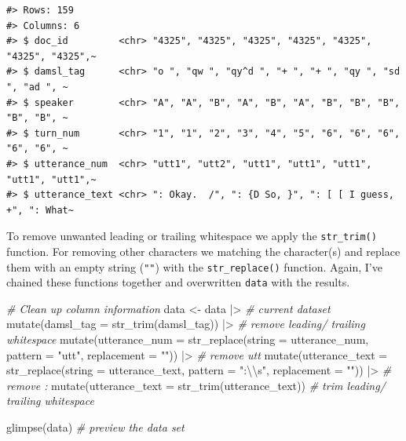 \documentclass[
  letterpaper,
]{scrbook}
\newenvironment{Shaded}{\begin{snugshade}}{\end{snugshade}}
\newcommand{\AttributeTok}[1]{\textcolor[rgb]{0.00,0.00,0.00}{#1}}
\newcommand{\CommentTok}[1]{\textcolor[rgb]{0.00,0.00,0.00}{\textit{#1}}}
\newcommand{\FunctionTok}[1]{\textcolor[rgb]{0.00,0.00,0.00}{#1}}
\newcommand{\NormalTok}[1]{\textcolor[rgb]{0.00,0.00,0.00}{#1}}
\newcommand{\OtherTok}[1]{\textcolor[rgb]{0.00,0.00,0.00}{#1}}
\newcommand{\SpecialCharTok}[1]{\textcolor[rgb]{0.00,0.00,0.00}{#1}}
\newcommand{\StringTok}[1]{\textcolor[rgb]{0.00,0.00,0.00}{#1}}
\begin{document}
\begin{verbatim}
#> Rows: 159
#> Columns: 6
#> $ doc_id         <chr> "4325", "4325", "4325", "4325", "4325", "4325", "4325",~
#> $ damsl_tag      <chr> "o ", "qw ", "qy^d ", "+ ", "+ ", "qy ", "sd ", "ad ", ~
#> $ speaker        <chr> "A", "A", "B", "A", "B", "A", "B", "B", "B", "B", "B", ~
#> $ turn_num       <chr> "1", "1", "2", "3", "4", "5", "6", "6", "6", "6", "6", ~
#> $ utterance_num  <chr> "utt1", "utt2", "utt1", "utt1", "utt1", "utt1", "utt1",~
#> $ utterance_text <chr> ": Okay.  /", ": {D So, }", ": [ [ I guess, +", ": What~
\end{verbatim}

To remove unwanted leading or trailing whitespace we apply the
\texttt{str\_trim()} function. For removing other characters we matching
the character(s) and replace them with an empty string (\texttt{""})
with the \texttt{str\_replace()} function. Again, I've chained these
functions together and overwritten \texttt{data} with the results.

\begin{Shaded}
\begin{Highlighting}[]
\CommentTok{\# Clean up column information}
\NormalTok{data }\OtherTok{\textless{}{-}} 
\NormalTok{  data }\SpecialCharTok{|\textgreater{}} \CommentTok{\# current dataset}
  \FunctionTok{mutate}\NormalTok{(}\AttributeTok{damsl\_tag =} \FunctionTok{str\_trim}\NormalTok{(damsl\_tag)) }\SpecialCharTok{|\textgreater{}} \CommentTok{\# remove leading/ trailing whitespace}
  \FunctionTok{mutate}\NormalTok{(}\AttributeTok{utterance\_num =} \FunctionTok{str\_replace}\NormalTok{(}\AttributeTok{string =}\NormalTok{ utterance\_num, }\AttributeTok{pattern =} \StringTok{"utt"}\NormalTok{, }\AttributeTok{replacement =} \StringTok{""}\NormalTok{)) }\SpecialCharTok{|\textgreater{}} \CommentTok{\# remove \textquotesingle{}utt\textquotesingle{}}
  \FunctionTok{mutate}\NormalTok{(}\AttributeTok{utterance\_text =} \FunctionTok{str\_replace}\NormalTok{(}\AttributeTok{string =}\NormalTok{ utterance\_text, }\AttributeTok{pattern =} \StringTok{":}\SpecialCharTok{\textbackslash{}\textbackslash{}}\StringTok{s"}\NormalTok{, }\AttributeTok{replacement =} \StringTok{""}\NormalTok{)) }\SpecialCharTok{|\textgreater{}} \CommentTok{\# remove \textquotesingle{}: \textquotesingle{}}
  \FunctionTok{mutate}\NormalTok{(}\AttributeTok{utterance\_text =} \FunctionTok{str\_trim}\NormalTok{(utterance\_text)) }\CommentTok{\# trim leading/ trailing whitespace}

\FunctionTok{glimpse}\NormalTok{(data) }\CommentTok{\# preview the data set}
\end{Highlighting}
\end{Shaded}
\end{document}
